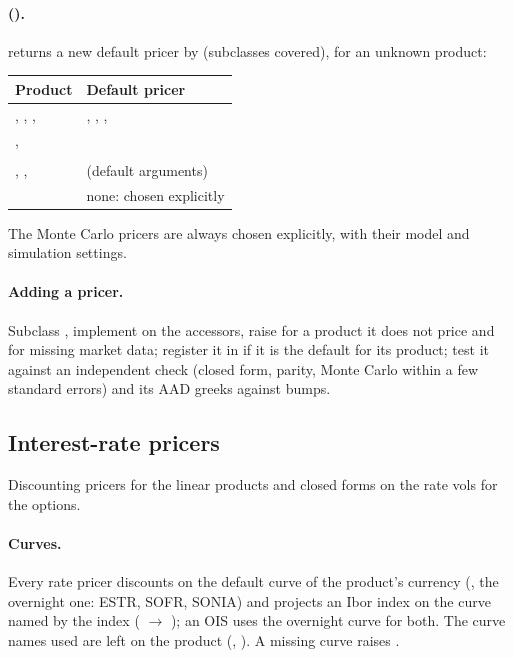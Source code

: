 \paragraph{ ().}  returns a new
default pricer by  (subclasses covered),  for an unknown product:
\begin{center}
\small
\begin{tabular}{@{}L{5.4cm}L{9.8cm}@{}}
\toprule
Product & Default pricer \\
\midrule
{}, , ,  & , , ,
   \\
,  &  \\
 &  \\
, ,  &  (default arguments) \\
 & none:  chosen explicitly \\
\bottomrule
\end{tabular}
\end{center}
The Monte Carlo pricers are always chosen explicitly, with their model and simulation settings.

\paragraph{Adding a pricer.} Subclass , implement  on the accessors, raise
 for a product it does not price and  for missing market data; register it in
 if it is the default for its product; test it against an independent check (closed form,
parity, Monte Carlo within a few standard errors) and its AAD greeks against bumps.

\subsection{Interest-rate pricers}\label{sec:arch-rates-pricers}
Discounting pricers for the linear products and closed forms on the rate vols for the options.

\paragraph{Curves.} Every rate pricer discounts on the default curve of the product's currency
(, the overnight one: ESTR, SOFR, SONIA) and projects an Ibor index on the
curve named by the index ( $\to$ ); an OIS uses the overnight
curve for both. The curve names used are left on the product (, ). A
missing curve raises .

